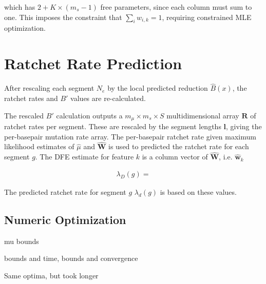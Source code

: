 \documentclass[11pt]{article}
\begin{document}
which has $2 + K \times (m_s-1)$ free parameters, since each column must sum to
one. This imposes the constraint that $\sum_i w_{i,k} = 1$, requiring
constrained MLE optimization. 

\section{Ratchet Rate Prediction}

After rescaling each segment $N_e$ by the local predicted reduction
$\hat{B}(x)$, the ratchet rates and $B'$ values are re-calculated. 

The rescaled $B'$ calculation outputs a $m_\mu \times m_s \times S$
multidimensional array $\mathbf{R}$ of ratchet rates per segment. These are
rescaled by the segment lengths $\mathbf{l}$, giving the per-basepair mutation
rate array. The per-basepair ratchet rate given maximum likelihood estimates of
$\hat{\mu}$ and $\widehat{\mathbf{W}}$ is used to predicted the ratchet rate
for each segment $g$. The DFE estimate for feature $k$ is a column vector of
$\widehat{\mathbf{W}}$, i.e. $\widehat{\mathbf{w}}_k$

\begin{align}
  \lambda_D(g) = 
\end{align}

The predicted ratchet rate for segment $g$ $\lambda_d(g)$ is based on these
values.
 
\subsection{Numeric Optimization}


mu bounds 

bounds and time, bounds and convergence

Same optima, but took longer
\end{document}
